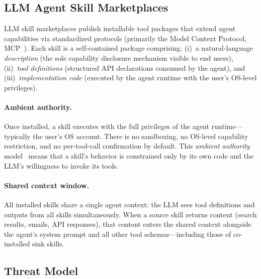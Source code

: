 
\subsection{LLM Agent Skill Marketplaces}

LLM skill marketplaces publish installable tool packages that extend
agent capabilities via standardized protocols (primarily the
Model Context Protocol, MCP~\cite{anthropic2024mcp}).
Each skill is a self-contained package comprising:
(i)~a natural-language \emph{description} (the sole capability disclosure
mechanism visible to end users),
(ii)~\emph{tool definitions} (structured API declarations consumed by the agent),
and (iii)~\emph{implementation code} (executed by the agent runtime
with the user's OS-level privileges).

\paragraph{Ambient authority.}
Once installed, a skill executes with the full privileges of the agent
runtime---typically the user's OS account.
There is no sandboxing, no OS-level capability restriction, and no
per-tool-call confirmation by default.
This \emph{ambient authority} model~\cite{ruan2024identifying}
means that a skill's behavior is constrained only by its own code
and the LLM's willingness to invoke its tools.

\paragraph{Shared context window.}
All installed skills share a single agent context: the LLM sees
tool definitions and outputs from all skills simultaneously.
When a source skill returns content (search results, emails, API responses),
that content enters the shared context alongside the agent's system prompt
and all other tool schemas---including those of co-installed sink skills.

\subsection{Threat Model}
\label{sec:threat_model}

